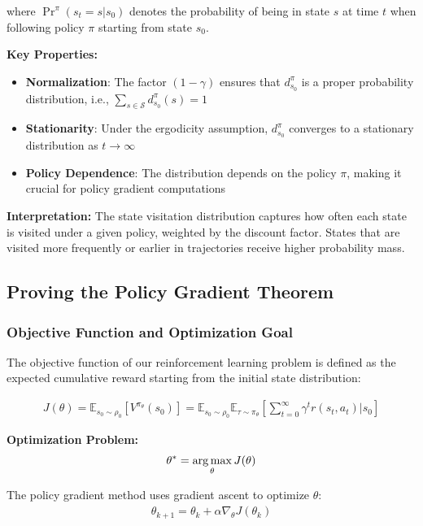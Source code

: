 where $\Pr^{\pi}(s_t = s|s_0)$ denotes the probability of being in state $s$ at time $t$ when following policy $\pi$ starting from state $s_0$.

\textbf{Key Properties:}
\begin{itemize}
    \item \textbf{Normalization}: The factor $(1-\gamma)$ ensures that $d^{\pi}_{s_0}$ is a proper probability distribution, i.e., $\sum_{s \in \mathcal{S}} d^{\pi}_{s_0}(s) = 1$
    \item \textbf{Stationarity}: Under the ergodicity assumption, $d^{\pi}_{s_0}$ converges to a stationary distribution as $t \rightarrow \infty$
    \item \textbf{Policy Dependence}: The distribution depends on the policy $\pi$, making it crucial for policy gradient computations
\end{itemize}

\textbf{Interpretation:}
The state visitation distribution captures how often each state is visited under a given policy, weighted by the discount factor. States that are visited more frequently or earlier in trajectories receive higher probability mass.

\subsection{Proving the Policy Gradient Theorem}

\subsubsection{Objective Function and Optimization Goal}

The objective function of our reinforcement learning problem is defined as the expected cumulative reward starting from the initial state distribution:

\begin{align}
    J(\theta) = \mathbb{E}_{s_0 \sim \rho_0} [V^{\pi_\theta}(s_0)] = \mathbb{E}_{s_0 \sim \rho_0} \mathbb{E}_{\tau \sim \pi_\theta} \left[ \sum_{t=0}^{\infty} \gamma^t r(s_t, a_t) \Big| s_0 \right]
\end{align}

\textbf{Optimization Problem:}
\begin{align}
    \theta^* = \operatorname*{arg\,max}_{\theta} J(\theta)
\end{align}

The policy gradient method uses gradient ascent to optimize $\theta$:
\begin{align}
    \theta_{k+1} = \theta_k + \alpha \nabla_\theta J(\theta_k)
\end{align}

